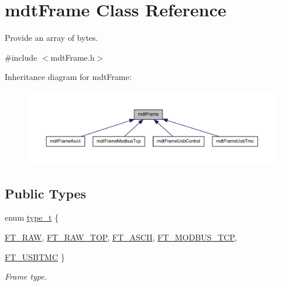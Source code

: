 \hypertarget{classmdt_frame}{
\section{mdtFrame Class Reference}
\label{classmdt_frame}
}


Provide an array of bytes.  




{\ttfamily \#include $<$mdtFrame.h$>$}



Inheritance diagram for mdtFrame:\nopagebreak
\begin{figure}[H]
\begin{center}
\leavevmode
\includegraphics[width=400pt]{classmdt_frame__inherit__graph}
\end{center}
\end{figure}
\subsection*{Public Types}
\begin{DoxyCompactItemize}
\item 
enum \hyperlink{classmdt_frame_af936e37d5fe4c066c0fb0161fafd4a17}{type\_\-t} \{ \par
\hyperlink{classmdt_frame_af936e37d5fe4c066c0fb0161fafd4a17aeb10e33f775c33799273fcb130fee86f}{FT\_\-RAW}, 
\hyperlink{classmdt_frame_af936e37d5fe4c066c0fb0161fafd4a17ac91a1c1827fa634eadaddb861f805c96}{FT\_\-RAW\_\-TOP}, 
\hyperlink{classmdt_frame_af936e37d5fe4c066c0fb0161fafd4a17ac649559564652abbe656b97d4a84b722}{FT\_\-ASCII}, 
\hyperlink{classmdt_frame_af936e37d5fe4c066c0fb0161fafd4a17a72c8ddaf29839f4037b686bdc346828a}{FT\_\-MODBUS\_\-TCP}, 
\par
\hyperlink{classmdt_frame_af936e37d5fe4c066c0fb0161fafd4a17aca438ff6b553a819f22090facc562c86}{FT\_\-USBTMC}
 \}
\begin{DoxyCompactList}\small\item\em Frame type. \end{DoxyCompactList}\end{DoxyCompactItemize}
